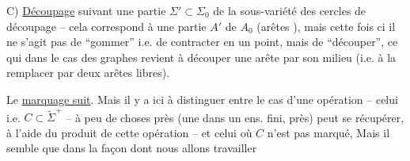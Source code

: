 C) \uline{Découpage}  suivant une partie  $\Sigma'\subset\Sigma_0$ de la sous-variété  des cercles de découpage -- cela correspond à une partie $A'$ de $A_0$ (arêtes ), mais cette fois ci il ne s'agit pas de ``gommer'' i.e. de contracter en un point, mais de ``découper'', ce qui dans le cas des graphes revient à découper une arête par son milieu (i.e. à la remplacer par deux arêtes libres).

Le \uline{marquage suit}.  Mais il y a ici à distinguer entre le cas d'une opération  -- celui   i.e. $C\subset\widetilde\Sigma^+$ --  à peu de choses près (une  dans un ens. fini,  près) peut se récupérer, à l'aide du produit de cette opération -- et celui où $C$ n'est pas marqué, Mais il semble que dans la façon dont nous allons travailler
